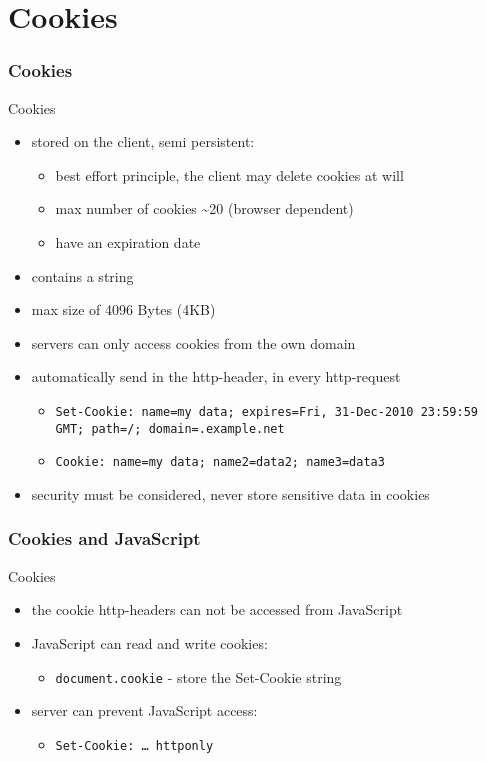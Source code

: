 \section{Cookies}
\begin{frame}[fragile]\frametitle{Cookies}
\color{structure}
Cookies
\begin{itemize}\color{structure}
  \item stored on the client, semi persistent:
  \begin{itemize}
    \item best effort principle, the client may delete cookies at will
    \item max number of cookies \textasciitilde 20 (browser dependent)
    \item have an expiration date
  \end{itemize}
  \item contains a string
  \item max size of 4096 Bytes (4KB)
  \item servers can only access cookies from the own domain
  \item automatically send in the http-header, in every http-request
  \begin{itemize}
    \item \texttt{Set-Cookie: name=my data; expires=Fri, 31-Dec-2010 23:59:59 GMT; path=/; domain=.example.net}
    \item \texttt{Cookie: name=my data; name2=data2; name3=data3}
  \end{itemize}
  \item security must be considered, never store sensitive data in cookies
\end{itemize}
\end{frame}

\begin{frame}[fragile]\frametitle{Cookies and JavaScript}
\color{structure}
Cookies
\begin{itemize}\color{structure}
  \item the cookie http-headers can not be accessed from JavaScript
  \item JavaScript can read and write cookies:
  \begin{itemize}
    \item \texttt{document.cookie} - store the Set-Cookie string
  \end{itemize}
  \item server can prevent JavaScript access:
  \begin{itemize}
    \item \texttt{Set-Cookie: \ldots \ httponly}
  \end{itemize}
\end{itemize}
\end{frame}

